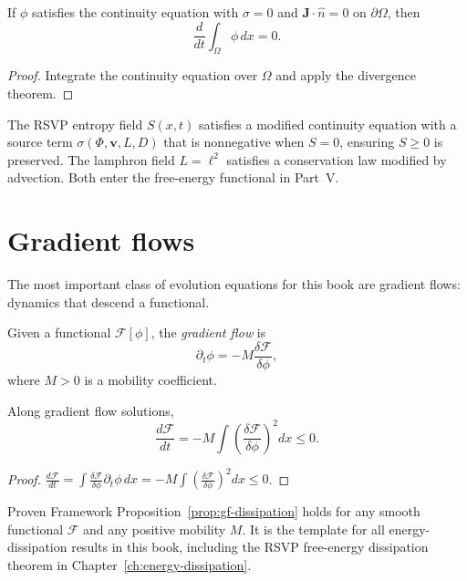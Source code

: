 \begin{proposition}
  If $\phi$ satisfies the continuity equation with $\sigma = 0$
  and $\mathbf{J} \cdot \hat{n} = 0$ on $\partial\Omega$, then
  \[
    \frac{d}{dt} \int_\Omega \phi \, dx = 0.
  \]
\end{proposition}

\begin{proof}
  Integrate the continuity equation over $\Omega$ and apply the
  divergence theorem.
\end{proof}

\begin{ForwardRef}
  The RSVP entropy field $S(x,t)$ satisfies a modified
  continuity equation with a source term $\sigma(\Phi,\mathbf{v},L,D)$
  that is nonnegative when $S = 0$, ensuring $S \geq 0$ is
  preserved.
  The lamphron field $L = \ell^2$ satisfies a conservation
  law modified by advection.
  Both enter the free-energy functional in Part~V\@.
\end{ForwardRef}

\section{Gradient flows}

The most important class of evolution equations for this book
are gradient flows: dynamics that descend a functional.

\begin{definition}
  Given a functional $\mathcal{F}[\phi]$, the
  \emph{gradient flow} is
  \[
    \partial_t \phi = -M \frac{\delta \mathcal{F}}{\delta \phi},
  \]
  where $M > 0$ is a mobility coefficient.
\end{definition}

\begin{proposition}
  \label{prop:gf-dissipation}
  Along gradient flow solutions,
  \[
    \frac{d\mathcal{F}}{dt}
    = -M \int \left(\frac{\delta\mathcal{F}}{\delta\phi}\right)^2 dx
    \leq 0.
  \]
\end{proposition}

\begin{proof}
  $\frac{d\mathcal{F}}{dt}
  = \int \frac{\delta\mathcal{F}}{\delta\phi} \partial_t\phi\, dx
  = -M \int \left(\frac{\delta\mathcal{F}}{\delta\phi}\right)^2 dx
  \leq 0$.
\end{proof}

\begin{StatusBox}{Proven Framework}
  Proposition~\ref{prop:gf-dissipation} holds for any smooth
  functional $\mathcal{F}$ and any positive mobility $M$.
  It is the template for all energy-dissipation results in
  this book, including the RSVP free-energy dissipation
  theorem in Chapter~\ref{ch:energy-dissipation}.
\end{StatusBox}

